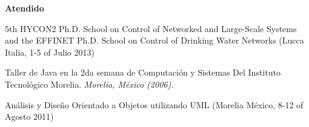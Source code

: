 \documentclass[7pt]{article}
\newenvironment{innerlist}[1][\enskip\textbullet]%
        {\begin{compactitem}[#1]}{\end{compactitem}}
\newcommand{\blankline}{\quad\pagebreak[2]}
\begin{document}
{\blankline

\textbf{Atendido}
\begin{innerlist}
\item 5th HYCON2 Ph.D. School on Control of Networked and Large-Scale Systems and the EFFINET Ph.D. School on Control of Drinking Water Networks  (Lucca Italia, 1-5 of Julio 2013)
\item Taller de Java en la 2da semana de Computación y Sistemas Del Instituto Tecnológico Morelia. \textit{Morelia, México (2006).}
\item Análisis y Diseño Orientado a Objetos utilizando  UML  (Morelia México,  8-12 of Agosto 2011)

\end{innerlist}
\end{document}
